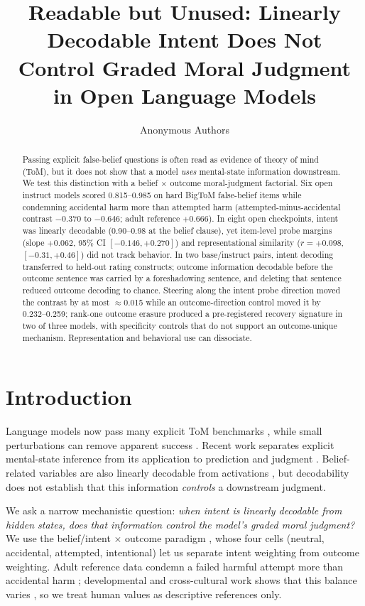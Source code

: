 \documentclass{article}
\title{Readable but Unused: Linearly Decodable Intent Does Not\\
Control Graded Moral Judgment in Open Language Models}
\author{Anonymous Authors}
\begin{document}
\maketitle

\begin{abstract}
Passing explicit false-belief questions is often read as evidence of theory of mind (ToM), but it does not show that a model \emph{uses} mental-state information downstream.
We test this distinction with a belief $\times$ outcome moral-judgment factorial.
Six open instruct models scored 0.815--0.985 on hard BigToM false-belief items while condemning accidental harm more than attempted harm (attempted-minus-accidental contrast $-0.370$ to $-0.646$; adult reference $+0.666$).
In eight open checkpoints, intent was linearly decodable (0.90--0.98 at the belief clause), yet item-level probe margins (slope $+0.062$, 95\% CI $[-0.146,+0.270]$) and representational similarity ($r=+0.098$, $[-0.31,+0.46]$) did not track behavior.
In two base/instruct pairs, intent decoding transferred to held-out rating constructs; outcome information decodable before the outcome sentence was carried by a foreshadowing sentence, and deleting that sentence reduced outcome decoding to chance.
Steering along the intent probe direction moved the contrast by at most $\approx$0.015 while an outcome-direction control moved it by 0.232--0.259; rank-one outcome erasure produced a pre-registered recovery signature in two of three models, with specificity controls that do not support an outcome-unique mechanism.
Representation and behavioral use can dissociate.
\end{abstract}

\section{Introduction}

Language models now pass many explicit ToM benchmarks \citep{gandhi2023bigtom,kosinski2024evaluating,chen2024tombench,strachan2024testing}, while small perturbations can remove apparent success \citep{ullman2023alterations,shapira2024clever}.
Recent work separates explicit mental-state inference from its application to prediction and judgment \citep{gu2026simpletom}.
Belief-related variables are also linearly decodable from activations \citep{zhu2024beliefs}, but decodability does not establish that this information \emph{controls} a downstream judgment.

We ask a narrow mechanistic question: \emph{when intent is linearly decodable from hidden states, does that information control the model's graded moral judgment?}
We use the belief/intent $\times$ outcome paradigm \citep{young2007neural,young2008belief,young2009innocent}, whose four cells (neutral, accidental, attempted, intentional) let us separate intent weighting from outcome weighting.
Adult reference data condemn a failed harmful attempt more than accidental harm \citep{young2007neural}; developmental and cross-cultural work shows that this balance varies \citep{cushman2013development,barrett2016societies,curtin2020kinship}, so we treat human values as descriptive references only.
\end{document}
